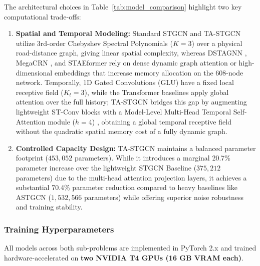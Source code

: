 \documentclass[a4paper,fleqn]{cas-sc}
\begin{document}
The architectural choices in Table~\ref{tab:model_comparison} highlight two key computational trade-offs:
\begin{enumerate}
    \item \textbf{Spatial and Temporal Modeling:} Standard STGCN \cite{stgcn} and TA-STGCN utilize 3rd-order Chebyshev Spectral Polynomials ($K=3$) \cite{chebnet} over a physical road-distance graph, giving linear spatial complexity, whereas DSTAGNN \cite{dstagnn}, MegaCRN \cite{megacrn}, and STAEformer \cite{staeformer} rely on dense dynamic graph attention or high-dimensional embeddings that increase memory allocation on the 608-node network. Temporally, 1D Gated Convolutions (GLU) \cite{stgcn} have a fixed local receptive field ($K_t=3$), while the Transformer baselines apply global attention over the full history; TA-STGCN bridges this gap by augmenting lightweight ST-Conv blocks with a Model-Level Multi-Head Temporal Self-Attention module ($h=4$) \cite{attention}, obtaining a global temporal receptive field without the quadratic spatial memory cost of a fully dynamic graph.
    \item \textbf{Controlled Capacity Design:} TA-STGCN maintains a balanced parameter footprint ($453,052$ parameters). While it introduces a marginal 20.7\% parameter increase over the lightweight STGCN Baseline ($375,212$ parameters) due to the multi-head attention projection layers, it achieves a substantial 70.4\% parameter reduction compared to heavy baselines like ASTGCN ($1,532,566$ parameters) while offering superior noise robustness and training stability.
\end{enumerate}

\subsubsection{Training Hyperparameters}
All models across both sub-problems are implemented in PyTorch 2.x and trained hardware-accelerated on \textbf{two NVIDIA T4 GPUs (16 GB VRAM each)}.
\end{document}
